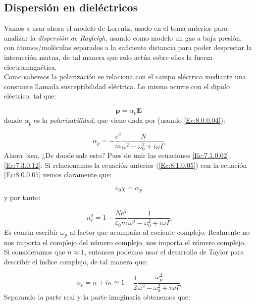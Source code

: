 \documentclass[12pt]{article}
\newcommand{\En}{\mathbf{E}}
\newcommand{\pn}{\mathbf{p}}
\numberwithin{equation}{section}
\numberwithin{figure}{section}
\begin{document}
\subsection{Dispersión en dieléctricos}

Vamos a usar ahora el modelo de Lorentz, usado en el tema anterior para analizar la \textit{dispersión de Rayleigh}, usando como modelo un gas a baja presión, con átomos/moléculas separados a la suficiente distancia para poder despreciar la interacción mutua, de tal manera que solo actúa sobre ellos la fuerza electromagnética. \\

Como sabemos la polarización se relaciona con el campo eléctrico mediante una constante llamada susceptibilidad eléctrica. Lo mismo ocurre con el dipolo eléctrico, tal que:

\begin{equation}
\pn = \alpha_p \En
\end{equation}
donde $\alpha_p$ es la \textit{polarizabilidad}, que viene dada por (usando \ref{Ec:8.0.0.04}):

\begin{equation}
\alpha_p = - \dfrac{e^2}{m} \dfrac{N}{\omega^2 - \omega_0^2 + i \omega \Gamma} \label{Ec:8.1.0.05}
\end{equation}
Ahora bien, ¿De donde sale esto? Pues de unir las ecuaciones \ref{Ec:7.1.0.02}, \ref{Ec:7.3.0.12}. Si relacionamos la ecuación anterior (\ref{Ec:8.1.0.05}) con la  ecuación \ref{Ec:8.0.0.01} vemos claramente que:

\begin{equation}
\varepsilon_0 \chi = \alpha_p
\end{equation}
y por tanto:

\begin{equation}
n^2_c = 1 - \dfrac{N e^2}{\varepsilon_0 m} \dfrac{1}{\omega^2 - \omega^2_0 + i \omega \Gamma} \label{Ec:8.1.0.07}
\end{equation}
Es común escribir $\omega_p$ al factor que acompaña al cociente complejo. Realmente no nos importa el complejo del número complejo, nos importa el número complejo. Si consideramos que $n \approx 1$, entonces podemos usar el desarrollo de Taylor para describir el índice complejo, de tal manera que:

\begin{equation}
n_c = n + i \kappa \simeq 1 - \dfrac{1}{2} \dfrac{\omega_p^2}{\omega^2 - \omega_0^2 + i \omega \Gamma}
\end{equation}
Separando la parte real y la parte imaginaria obtenemos que:
\end{document}
